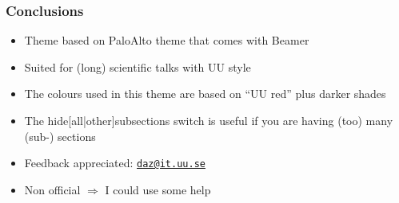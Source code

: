 \documentclass{beamer}
\begin{document}
\begin{frame}
  \frametitle{Conclusions}

  \begin{itemize}
    \item Theme based on PaloAlto theme that comes with Beamer
    \item Suited for (long) scientific talks with UU style
    \item The colours used in this theme are based on  ``UU red'' plus darker shades
    \item The hide[all|other]subsections switch is useful if you are having (too) many (sub-) sections
    \item Feedback appreciated: \href{mailto:daz@it.uu.se}{\texttt{daz@it.uu.se}}
    \item Non official $\Rightarrow$ I could use some help
  \end{itemize}
\end{frame}

\begin{frame}[plain]
  \begin{centering}
    \par
  \end{centering}
\end{frame}
\end{document}

